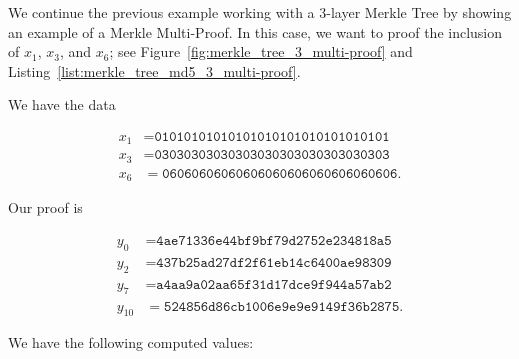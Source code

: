 \begin{example}
\label{example:hash_app_merkle_tree_multi-proof}

We continue the previous example working with a 3-layer Merkle Tree
by showing an example of a Merkle Multi-Proof.
In this case, we want to proof the inclusion of
$x_{1}$, $x_{3}$, and $x_{6}$;
see Figure~\ref{fig:merkle_tree_3_multi-proof}
and Listing~\ref{list:merkle_tree_md5_3_multi-proof}.




We have the data

\begin{align}
    x_{1} &= \texttt{01010101010101010101010101010101}
        \nonumber\\
    x_{3} &= \texttt{03030303030303030303030303030303}
        \nonumber\\
    x_{6} &= \texttt{06060606060606060606060606060606}.
\end{align}

\noindent
Our proof is

\begin{align}
    y_{0}  &= \texttt{4ae71336e44bf9bf79d2752e234818a5}
        \nonumber\\
    y_{2}  &= \texttt{437b25ad27df2f61eb14c6400ae98309}
        \nonumber\\
    y_{7}  &= \texttt{a4aa9a02aa65f31d17dce9f944a57ab2}
        \nonumber\\
    y_{10} &= \texttt{524856d86cb1006e9e9e9149f36b2875}.
\end{align}

\noindent
We have the following computed values:


\end{example}
